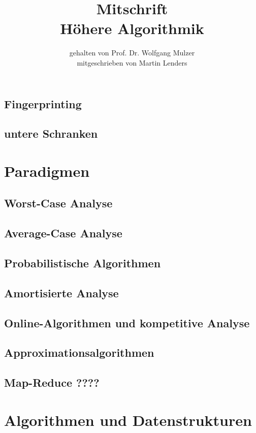 \documentclass[a4paper,10pt]{scrbook}
\title{Mitschrift\\{\LARGE Höhere Algorithmik}}
\author{gehalten von Prof. Dr. Wolfgang Mulzer \\ mitgeschrieben von Martin Lenders}
\begin{document}
\maketitle
\tableofcontents

























\section{Fingerprinting}
\section{untere Schranken}
\chapter{Paradigmen}
\section{Worst-Case Analyse}
\section{Average-Case Analyse}
\section{Probabilistische Algorithmen}
\section{Amortisierte Analyse}
\section{Online-Algorithmen und kompetitive Analyse}
\section{Approximationsalgorithmen}
\section{Map-Reduce ????}
\chapter{Algorithmen und Datenstrukturen}
\end{document}
